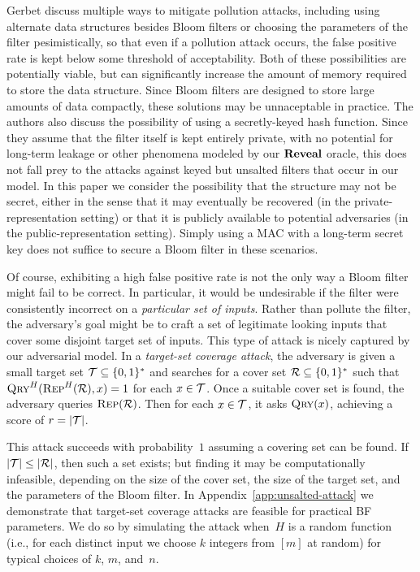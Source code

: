 Gerbet \etal discuss multiple ways to mitigate pollution attacks, including
using alternate data structures besides Bloom filters or choosing the parameters
of the filter pesimistically, so that even if a pollution attack occurs, the
false positive rate is kept below some threshold of acceptability. Both of these
possibilities are potentially viable, but can significantly increase the amount
of memory required to store the data structure. Since Bloom filters are designed
to store large amounts of data compactly, these solutions may be unnaceptable in
practice. The authors also discuss the possibility of using a secretly-keyed
hash function. Since they assume that the filter itself is kept entirely
private, with no potential for long-term leakage or other phenomena modeled by
our $\mathbf{Reveal}$ oracle, this does not fall prey to the attacks against keyed but
unsalted filters that occur in our model. In this paper we consider the
possibility that the structure may not be secret, either in the sense that it
may eventually be recovered (in the private-representation setting) or that it
is publicly available to potential adversaries (in the public-representation
setting). Simply using a MAC with a long-term secret key does not suffice to
secure a Bloom filter in these scenarios.

%
Of course, exhibiting a high false positive rate is not the only way a Bloom
filter might fail to be correct. In particular, it would be undesirable if the
filter were consistently incorrect on a \emph{particular set of inputs}. Rather
than pollute the filter, the adversary's goal might be to craft a set of
legitimate looking inputs that cover some disjoint target set of inputs.
%
This type of attack is nicely captured by our adversarial model.
%
In a \emph{target-set coverage attack}, the adversary is given a small target set
$\mathcal{T}\subseteq\{0,1\}^*$ and searches for a cover set $\mathcal{R}\subseteq\{0,1\}^*$
such that $\textnormal{\textsc{Qry}}^H(\textnormal{\textsc{Rep}}^H(\mathcal{R}),x)=1$ for each $x\in\mathcal{T}$.
%
Once a suitable cover set is found, the adversary queries $\textnormal{\textsc{Rep}}(\mathcal{R})$. Then
for each $x\in\mathcal{T}$, it asks $\textnormal{\textsc{Qry}}(x)$, achieving a score of $r = |\mathcal{T}|$.

This  attack succeeds with probability~$1$ assuming a covering set can
be found.  If $|\mathcal{T}| \leq |\mathcal{R}|$, then such a set exists; but finding it may be
computationally infeasible, depending on the size of the cover set, the size of
the target set, and the parameters of the Bloom filter.
%
In Appendix~\ref{app:unsalted-attack} we demonstrate that target-set coverage
attacks are feasible for practical BF parameters. We do so by simulating the
attack when~$H$ is a random function (i.e., for each distinct input we choose
$k$ integers from $[m]$ at random) for typical choices of $k$, $m$, and~$n$.

